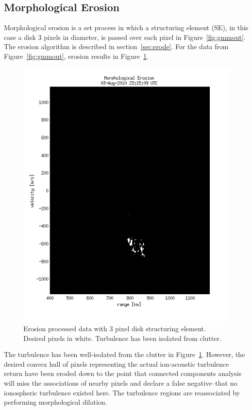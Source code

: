 \subsection{Morphological Erosion}
Morphological erosion is a set process in which a structuring element (SE), in this case a disk 3 pixels in diameter, is passed over each pixel in Figure~\ref{fig:gmmout}.
The erosion algorithm is described in section~\ref{sec:erode}.
For the data from Figure~\ref{fig:gmmout}, erosion results in Figure~\ref{fig:erodeout}.
\begin{figure}\centering
	\includegraphics[width=\linewidth,trim=0 20 0 20,clip]{gfx/erodeout}
	\caption{Erosion processed data with 3 pixel disk structuring element. Desired pixels in white. Turbulence has been isolated from clutter.}\label{fig:erodeout}
\end{figure}
The turbulence has been well-isolated from the clutter in Figure~\ref{fig:erodeout}.
However, the desired convex hull of pixels representing the actual ion-acoustic turbulence return have been eroded down to the point that connected components analysis will miss the associations of nearby pixels and declare a false negative--that no ionospheric turbulence existed here. 
The turbulence regions are reassociated by performing morphological dilation.

